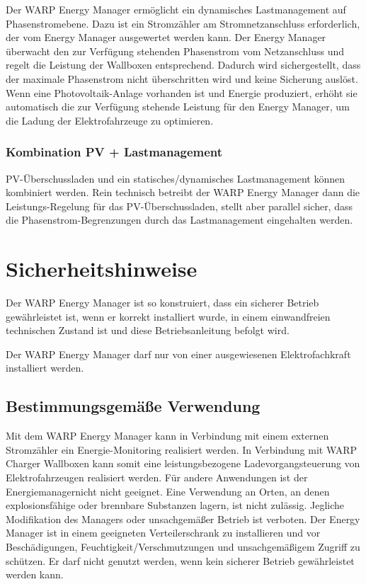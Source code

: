 \documentclass[a4paper,10pt]{article}
\newcommand{\hint}[1]{\begin{tcolorbox}[colback=boxgray,colframe=black,coltext=
white,title=Hinweis,left*=2mm,right*=2mm,boxsep=1mm,bottom=1mm,top=1mm]#1\end{tcolorbox}}
\begin{document}
\begin{multicols*}{2}
	Der WARP Energy Manager ermöglicht ein dynamisches Lastmanagement auf Phasenstromebene.
	Dazu ist ein Stromzähler am Stromnetzanschluss erforderlich, der vom Energy Manager
	ausgewertet werden kann. Der Energy Manager überwacht den zur Verfügung stehenden
	Phasenstrom vom Netzanschluss und regelt die Leistung der Wallboxen entsprechend.
	Dadurch wird sichergestellt, dass der maximale Phasenstrom nicht überschritten wird
	und keine Sicherung auslöst. Wenn eine Photovoltaik-Anlage vorhanden ist und Energie
	produziert, erhöht sie automatisch die zur Verfügung stehende Leistung für den
	Energy Manager, um die Ladung der Elektrofahrzeuge zu optimieren.

	\subsubsection{Kombination PV + Lastmanagement}
	PV-Überschussladen und ein statisches/dynamisches Lastmanagement können
	kombiniert werden. Rein technisch betreibt der WARP Energy Manager dann die
	Leistungs-Regelung für das PV-Überschussladen, stellt aber parallel sicher, dass die
	Phasenstrom-Begrenzungen durch das Lastmanagement eingehalten werden.

	\section{Sicherheitshinweise}
	Der WARP Energy Manager ist so konstruiert, dass ein sicherer Betrieb gewährleistet ist,
	wenn er korrekt installiert wurde, in einem einwandfreien technischen Zustand
	ist und diese Betriebsanleitung befolgt wird. \hint{Der WARP Energy Manager darf nur von einer ausgewiesenen Elektrofachkraft installiert
		werden.}

	\subsection{Bestimmungsgemäße Verwendung}
	Mit dem WARP Energy Manager kann in Verbindung mit einem externen
	Stromzähler ein Energie-Monitoring realisiert werden. In Verbindung mit WARP
	Charger Wallboxen kann somit eine leistungsbezogene Ladevorgangsteuerung von
	Elektrofahrzeugen realisiert werden. Für andere Anwendungen ist der
	Energiemanagernicht nicht geeignet. Eine Verwendung
	an Orten, an denen explosionsfähige oder brennbare Substanzen lagern, ist nicht
	zulässig. Jegliche Modifikation des Managers oder unsachgemäßer Betrieb ist verboten. 
	Der Energy Manager ist in einem geeigneten Verteilerschrank zu installieren
	und vor Beschädigungen, Feuchtigkeit/Verschmutzungen und unsachgemäßigem
	Zugriff zu 	schützen. Er darf nicht genutzt werden, wenn kein sicherer Betrieb
	gewährleistet werden kann.


\end{multicols*}
\end{document}
